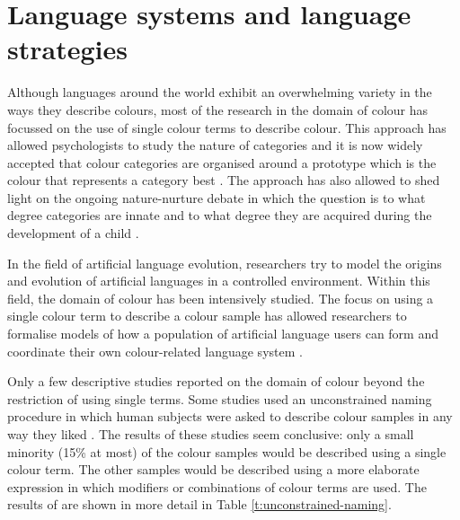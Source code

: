 \chapter{Language systems and language strategies}

Although languages around the world exhibit an overwhelming variety in
the ways they describe colours, most of the research in the domain of
colour has focussed on the use of single colour terms to describe
colour. This approach has allowed psychologists to study the nature of
categories and it is now widely accepted that colour categories are organised around a
prototype which is the colour that represents a category best
\citep{rosch73natural}. The approach has also allowed to shed light
on the ongoing nature-nurture debate in which the question is to what
degree categories are innate and to what degree they are acquired
during the development of a child \citep{berlin69basic}.

In the field of artificial language evolution, researchers try to
model the origins and evolution of artificial languages in a
controlled environment. Within this field, the domain of colour has
been intensively studied. The focus on using a single colour term to
describe a colour sample has allowed researchers to formalise models
of how a population of artificial language users can form and
coordinate their own colour-related language system
\citep{steels05coordinating, belpaeme05explaining, belpaeme07language,
  puglisi08cultural, baronchelli10modeling}.

Only a few descriptive studies reported on the domain of colour beyond
the restriction of using single terms. Some studies used an
unconstrained naming procedure in which human subjects were asked to
describe colour samples in any way they liked \citep{simpson91sex,
  lin01unconstrained}. The results of these studies seem conclusive:
only a small minority (15\% at most) of the colour samples would be
described using a single colour term. The other samples would be
described using a more elaborate expression in which modifiers or
combinations of colour terms are used. The results of
\citet{lin01unconstrained} are shown in more detail in Table
\ref{t:unconstrained-naming}.

